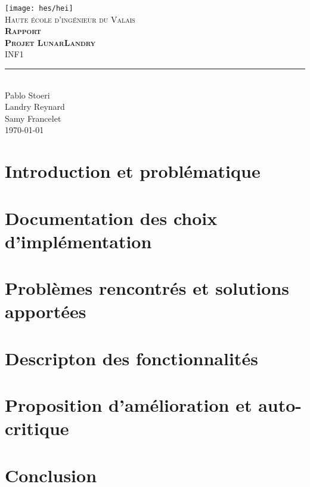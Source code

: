 \documentclass[11pt,titlepage]{report}
\def\Autora{Pablo Stoeri}
\def\Autorb{Landry Reynard}
\def\Autorc{Samy Francelet}
\begin{document}
\begin{titlepage}
	\centering
    \texttt{[image: hes/hei]}\\[1cm] 	%
    \textsc{\LARGE Haute école d'ingénieur du Valais}\\ \vspace{\fill}
    \textbf{\textsc{\fontsize{50}{50}\selectfont Rapport}}\\[0.8cm]
		\textbf{\textsc{\fontsize{30}{30}\selectfont Projet LunarLandry}}\\ \vspace{\fill}
	\textsc{\LARGE INF1}\\[0.4cm]
	\rule{\linewidth}{0.2 mm} \\[0.5 cm]
		\Autora \\
		\Autorb \\
		\Autorc \\[2cm]
	\today
\end{titlepage}
\restoregeometry

\tableofcontents

\chapter{Introduction et problématique}


\chapter{Documentation des choix d'implémentation}


\chapter{Problèmes rencontrés et solutions apportées}


\chapter{Descripton des fonctionnalités}


\chapter{Proposition d'amélioration et auto-critique}


\chapter{Conclusion}

\end{document}
